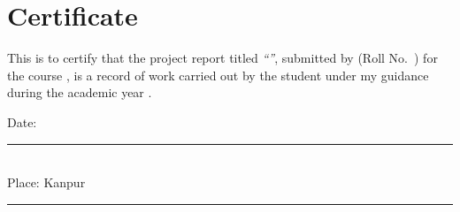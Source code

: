 \chapter*{Certificate}

This is to certify that the project report titled \emph{``\reporttitle''}, submitted by \textbf{\studentname} (Roll No.\ \rollno) for the
course \course, is a record of work carried out by the student under my guidance during the academic year
\semester.

\vspace{3cm}

\noindent
\begin{minipage}[t]{0.45\linewidth}
Date: \rule{4cm}{0.4pt}\\[0.4cm]
Place: Kanpur
\end{minipage}\hfill
\begin{minipage}[t]{0.5\linewidth}
\raggedleft
\rule{6.5cm}{0.4pt}\\[0.2cm]
\instructor\\
\department\\
\institute
\end{minipage}
